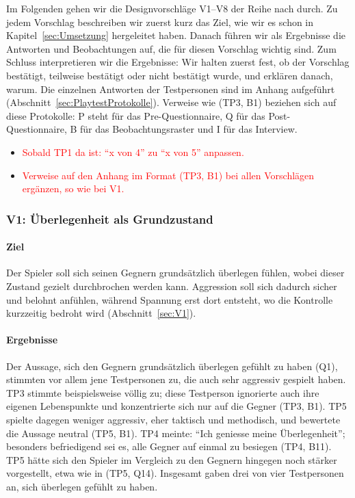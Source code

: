 \documentclass[../Main.tex]{subfiles}
\begin{document}
Im Folgenden gehen wir die Designvorschläge V1--V8 der Reihe nach durch. Zu jedem Vorschlag beschreiben wir zuerst kurz das Ziel, wie wir es schon in Kapitel~\ref{sec:Umsetzung} hergeleitet haben. Danach führen wir als Ergebnisse die Antworten und Beobachtungen auf, die für diesen Vorschlag wichtig sind. Zum Schluss interpretieren wir die Ergebnisse: Wir halten zuerst fest, ob der Vorschlag bestätigt, teilweise bestätigt oder nicht bestätigt wurde, und erklären danach, warum. Die einzelnen Antworten der Testpersonen sind im Anhang aufgeführt (Abschnitt~\ref{sec:PlaytestProtokolle}). Verweise wie (TP3, B1) beziehen sich auf diese Protokolle: P steht für das Pre-Questionnaire, Q für das Post-Questionnaire, B für das Beobachtungsraster und I für das Interview.

\begin{itemize}[leftmargin=1.5cm]
    \item \textcolor{red}{Sobald TP1 da ist: \enquote{x von 4} zu \enquote{x von 5} anpassen.}
    \item \textcolor{red}{Verweise auf den Anhang im Format (TP3, B1) bei allen Vorschlägen ergänzen, so wie bei V1.}
\end{itemize}

\subsubsection{V1: Überlegenheit als Grundzustand}

\paragraph{Ziel}
Der Spieler soll sich seinen Gegnern grundsätzlich überlegen fühlen, wobei dieser Zustand gezielt durchbrochen werden kann. Aggression soll sich dadurch sicher und belohnt anfühlen, während Spannung erst dort entsteht, wo die Kontrolle kurzzeitig bedroht wird (Abschnitt~\ref{sec:V1}).

\paragraph{Ergebnisse}
Der Aussage, sich den Gegnern grundsätzlich überlegen gefühlt zu haben (Q1), stimmten vor allem jene Testpersonen zu, die auch sehr aggressiv gespielt haben. TP3 stimmte beispielsweise völlig zu; diese Testperson ignorierte auch ihre eigenen Lebenspunkte und konzentrierte sich nur auf die Gegner (TP3, B1). TP5 spielte dagegen weniger aggressiv, eher taktisch und methodisch, und bewertete die Aussage neutral (TP5, B1). TP4 meinte: \enquote{Ich geniesse meine Überlegenheit}; besonders befriedigend sei es, alle Gegner auf einmal zu besiegen (TP4, B11). TP5 hätte sich den Spieler im Vergleich zu den Gegnern hingegen noch stärker vorgestellt, etwa wie in  (TP5, Q14). Insgesamt gaben drei von vier Testpersonen an, sich überlegen gefühlt zu haben.
\end{document}
